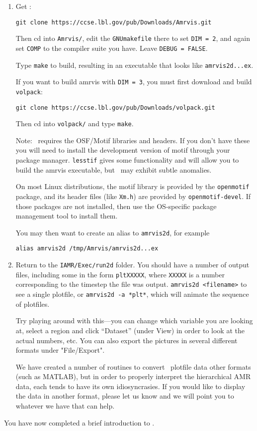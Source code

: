 \begin{enumerate}

\item Get \amrvis:
\begin{verbatim}
git clone https://ccse.lbl.gov/pub/Downloads/Amrvis.git
\end{verbatim}

Then cd into {\tt Amrvis/}, edit the {\tt GNUmakefile} there
to set {\tt DIM = 2}, and again set {\tt COMP} to the compiler
suite you have. Leave {\tt DEBUG = FALSE}.

Type {\tt make} to build, resulting in an executable that
looks like {\tt amrvis2d...ex}.

If you want to build amrvis with {\tt DIM = 3}, you must first
download and build {\tt volpack}:
\begin{verbatim}
git clone https://ccse.lbl.gov/pub/Downloads/volpack.git
\end{verbatim}

Then cd into {\tt volpack/} and type {\tt make}.

Note: \amrvis\ requires the OSF/Motif libraries and headers. If you don't have these 
you will need to install the development version of motif through your package manager. 
{\tt lesstif} gives some functionality and will allow you to build the amrvis executable, 
but \amrvis\ may exhibit subtle anomalies.

On most Linux distributions, the motif library is provided by the
{\tt openmotif} package, and its header files (like {\tt Xm.h}) are provided
by {\tt openmotif-devel}. If those packages are not installed, then use the
OS-specific package management tool to install them. 

You may then want to create an alias to {\tt amrvis2d}, for example
\begin{verbatim}
alias amrvis2d /tmp/Amrvis/amrvis2d...ex
\end{verbatim}

\item Return to the {\tt IAMR/Exec/run2d} folder.  You should
  have a number of output files, including some in the form {\tt *pltXXXXX},
  where {\tt XXXXX} is a number corresponding to the timestep the file
  was output.  {\tt amrvis2d <filename>} to see a single plotfile, 
   or {\tt amrvis2d -a *plt*}, which will animate the sequence of plotfiles.

  Try playing
  around with this---you can change which variable you are
  looking at, select a region and click ``Dataset'' (under View)
  in order to look at the actual numbers, etc. You can also export the
  pictures in several different formats under "File/Export".

We have created a number of routines to convert \amrex\ plotfile data
other formats (such as MATLAB), but in order to properly interpret 
the hierarchical AMR data, each tends to have its own idiosyncrasies.
If you would like to display the data in another format, please let us know
and we will point you to whatever we have that can help.

\end{enumerate}

You have now completed a brief introduction to \iamr. 
